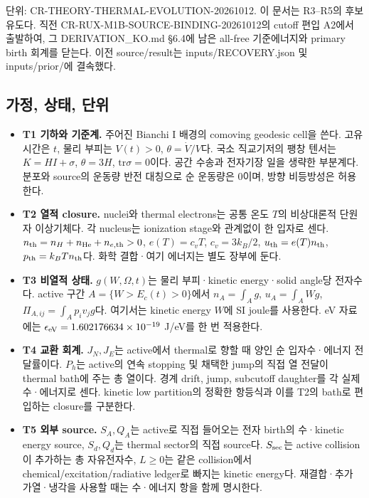 \documentclass[11pt,a4paper]{article}
\providecommand{\tightlist}{\setlength{\itemsep}{2pt}\setlength{\parskip}{0pt}}
\begin{document}
단위: CR-THEORY-THERMAL-EVOLUTION-20261012. 이 문서는 R3--R5의 후보 유도다. 직전 CR-RUX-M1B-SOURCE-BINDING-20261012의 cutoff 편입 A2에서 출발하여, 그 DERIVATION\_KO.md §6.4에 남은 all-free 기준에너지와 primary birth 회계를 닫는다. 이전 source/result는 inputs/RECOVERY.json 및 inputs/prior/에 결속했다.

\hypertarget{uxac00uxc815-uxc0c1uxd0dc-uxb2e8uxc704}{%
\subsection{가정, 상태, 단위}\label{uxac00uxc815-uxc0c1uxd0dc-uxb2e8uxc704}}

\begin{itemize}
\tightlist
\item
  \textbf{T1 기하와 기준계.} 주어진 Bianchi I 배경의 comoving geodesic cell을 쓴다. 고유시간은 \(t\), 물리 부피는 \(V(t)>0\), \(\theta=\dot V/V\)다. 국소 직교기저의 팽창 텐서는 \(K=H I+\sigma\), \(\theta=3H\), \(\mathrm{tr}\sigma=0\)이다. 공간 수송과 전자기장 일을 생략한 부분계다. 분포와 source의 운동량 반전 대칭으로 순 운동량은 0이며, 방향 비등방성은 허용한다.
\item
  \textbf{T2 열적 closure.} nuclei와 thermal electrons는 공통 온도 \(T\)의 비상대론적 단원자 이상기체다. 각 nucleus는 ionization stage와 관계없이 한 입자로 센다. \(n_{\rm th}=n_H+n_{\rm He}+n_{e,\rm th}>0\), \(e(T)=c_vT\), \(c_v=3k_B/2\), \(u_{\rm th}=e(T)n_{\rm th}\), \(p_{\rm th}=k_BTn_{\rm th}\)다. 화학 결합·여기 에너지는 별도 장부에 둔다.
\item
  \textbf{T3 비열적 상태.} \(g(W,\Omega,t)\)는 물리 부피·kinetic energy·solid angle당 전자수다. active 구간 \(A=\{W>E_c(t)>0\}\)에서 \(n_A=\int_Ag\), \(u_A=\int_AWg\), \(\Pi_{A,ij}=\int_Ap_iv_jg\)다. 여기서는 kinetic energy \(W\)에 SI joule를 사용한다. eV 자료에는 \(\epsilon_{\rm eV}=1.602176634\times10^{-19}\) J/eV를 한 번 적용한다.
\item
  \textbf{T4 교환 회계.} \(J_N,J_E\)는 active에서 thermal로 향할 때 양인 순 입자수·에너지 전달률이다. \(P_h\)는 active의 연속 stopping 및 채택한 jump의 직접 열 전달이 thermal bath에 주는 총 열이다. 경계 drift, jump, subcutoff daughter를 각 실제 수·에너지로 센다. kinetic low partition의 정확한 항등식과 이를 T2의 bath로 편입하는 closure를 구분한다.
\item
  \textbf{T5 외부 source.} \(S_A,Q_A\)는 active로 직접 들어오는 전자 birth의 수·kinetic energy source, \(S_d,Q_d\)는 thermal sector의 직접 source다. \(S_{\rm sec}\)는 active collision이 추가하는 총 자유전자수, \(L\ge0\)는 같은 collision에서 chemical/excitation/radiative ledger로 빠지는 kinetic energy다. 재결합·추가 가열·냉각을 사용할 때는 수·에너지 항을 함께 명시한다.
\end{itemize}
\end{document}
